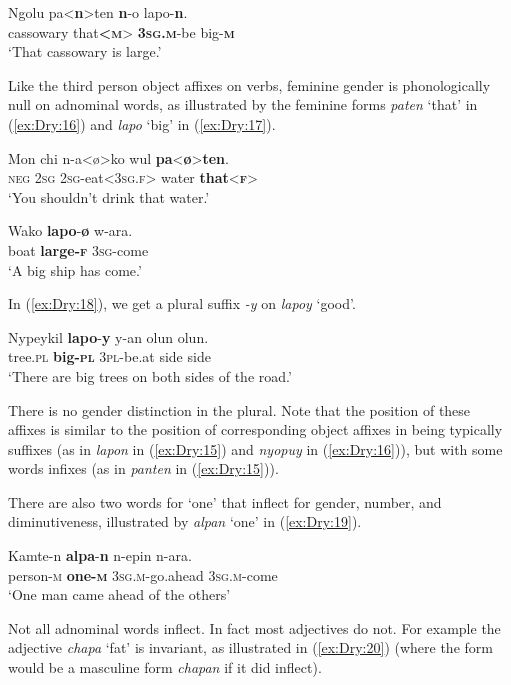 \documentclass[output=collectionpaper]{langsci/langscibook}
\begin{document}
\ea  \label{ex:Dry:15}
\gll Ngolu	pa<\textbf{n}>ten	\textbf{n}-o	lapo-\textbf{n}.\\
cassowary that\textbf{<\textsc{m}}> \textbf{\textsc{3sg.m}}-be big-\textbf{\textsc{m}}\\
\glt `That cassowary is large.'
\z

Like the third person object affixes on verbs, feminine gender is phonologically null on adnominal words, as illustrated by the feminine forms \textit{paten} `that' in (\ref{ex:Dry:16}) and \textit{lapo} `big' in (\ref{ex:Dry:17}).

\ea \label{ex:Dry:16}
\gll Mon	chi	n-a<ø>ko	wul	\textbf{pa}<\textbf{ø}>\textbf{ten}.\\
\textsc{neg} \textsc{2sg} \textsc{2sg}-eat<\textsc{3sg.f}> water \textbf{that}<\textbf{\textsc{f}}>\\
\glt `You shouldn't drink that water.'
\z

\ea \label{ex:Dry:17}
\gll Wako	\textbf{lapo}-\textbf{ø}	w-ara.\\
boat \textbf{large-\textsc{f}} \textsc{3sg}-come\\
\glt `A big ship has come.'
\z

In (\ref{ex:Dry:18}), we get a plural suffix \textit{-y} on \textit{lapoy} `good'.

\ea  \label{ex:Dry:18}
\gll Nypeykil	\textbf{lapo}-\textbf{y}	y-an	olun	olun. \\
tree.\textsc{pl} \textbf{big-\textsc{pl}} \textsc{3pl}-be.at side side\\
\glt  `There are big trees on both sides of the road.'
\z

There is no gender distinction in the plural. Note that the position of these affixes is similar to the position of corresponding object affixes in being typically suffixes (as in \textit{lapon} in (\ref{ex:Dry:15}) and \textit{nyopuy} in (\ref{ex:Dry:16})), but with some words infixes (as in \textit{panten} in (\ref{ex:Dry:15})).

There are also two words for `one' that inflect for gender, number, and diminutiveness, illustrated by \textit{alpan} `one' in (\ref{ex:Dry:19}).

\ea  \label{ex:Dry:19}
\gll Kamte-n	\textbf{alpa}-\textbf{n}	n-epin	n-ara.\\
person-\textsc{m} \textbf{one-\textsc{m}} \textsc{3sg.m}-go.ahead \textsc{3sg.m}-come\\
\glt `One man came ahead of the others'
\z

  Not all adnominal words inflect. In fact most adjectives do not. For example the adjective \textit{chapa} `fat' is invariant, as illustrated in (\ref{ex:Dry:20}) (where the form would be a masculine form \textit{chapan} if it did inflect).
\end{document}
